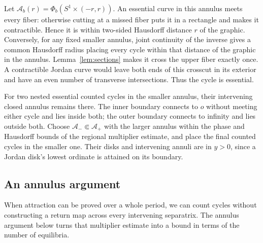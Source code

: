 Let $\mathcal A_b(r)=\Phi_b(S^1\times(-r,r))$.
An essential curve in this annulus meets every fiber: otherwise
cutting at a missed fiber puts it in a rectangle and makes it
contractible. Hence it is within two-sided Hausdorff distance
$r$ of the graphic. Conversely, for any fixed smaller annulus, joint
continuity of the inverse gives a common Hausdorff radius placing every
cycle within that distance of the graphic in the annulus.
Lemma~\ref{lem:sections} makes it
cross the upper fiber exactly once. A contractible Jordan curve
would leave both ends of this crosscut in its exterior and have
an even number of transverse intersections. Thus the cycle is
essential.

For two nested essential counted cycles in the smaller annulus, their
intervening closed annulus remains there. The inner boundary
connects to $o$ without meeting either cycle and lies inside both;
the outer boundary connects to infinity and lies outside both.
Choose $\mathcal A_-\Subset\mathcal A_+$ with the larger annulus
within the phase and Hausdorff bounds of the regional multiplier
estimate, and place the final counted cycles in the smaller one.
Their disks and intervening annuli are in $y>0$, since a Jordan
disk's lowest ordinate is attained on its boundary.

\subsection{An annulus argument}
When attraction can be proved over a whole period, we can count cycles
without constructing a return map across every intervening separatrix.
The annulus argument below turns that multiplier estimate into a bound in
terms of the number of equilibria.

